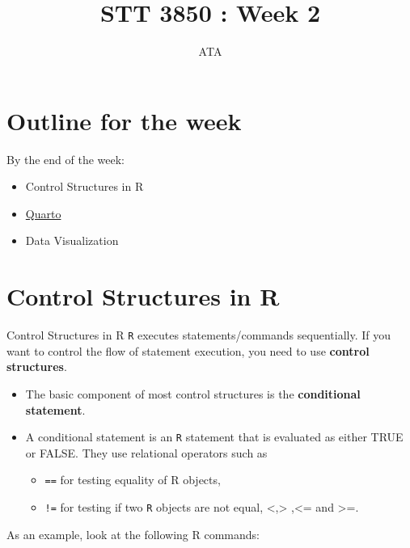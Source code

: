 \documentclass[
  ignorenonframetext,
]{beamer}
\title{STT 3850 : Week 2}
\author{ATA}
\date{}
\institute{Appalachian State University}
\providecommand{\tightlist}{%
  \setlength{\itemsep}{0pt}\setlength{\parskip}{0pt}}
\begin{document}
\frame{\titlepage}

\section{Outline for the week}\label{outline-for-the-week}

\begin{frame}{By the end of the week:}
\label{by-the-end-of-the-week}
\begin{itemize}
\tightlist
\item
  Control Structures in R
\item
  \href{https://quarto.org/}{Quarto}
\item
  Data Visualization
\end{itemize}
\end{frame}

\section{Control Structures in R}\label{control-structures-in-r}

\begin{frame}[fragile]{Control Structures in R}
\label{control-structures-in-r-1}
\texttt{R} executes statements/commands sequentially. If you want to
control the flow of statement execution, you need to use \textbf{control
structures}.

\begin{itemize}
\item
  The basic component of most control structures is the
  \textbf{conditional statement}.
\item
  A conditional statement is an \texttt{R} statement that is evaluated
  as either TRUE or FALSE. They use relational operators such as

  \begin{itemize}
  \item
    \texttt{==} for testing equality of R objects,
  \item
    \texttt{!=} for testing if two \texttt{R} objects are not equal,
    \textless,\textgreater{} ,\textless= and \textgreater=.
  \end{itemize}
\end{itemize}

As an example, look at the following R commands:
\end{frame}
\end{document}
